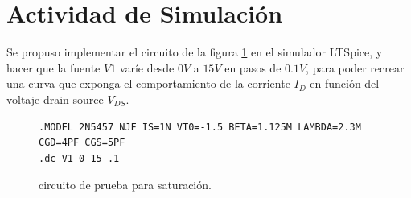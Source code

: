   \section{Actividad de Simulación}
    Se propuso implementar el circuito de la figura \ref{crkt:jfet-sat} en el simulador LTSpice, y hacer que la fuente
    $V1$ varíe desde $0V$ a $15V$ en pasos de $0.1V$, para poder recrear una curva que exponga el comportamiento de la
    corriente $I_D$ en función del voltaje drain-source $V_{DS}$.
    \begin{figure}[!ht]
      \centering
      \begin{minipage}{0.45\textwidth}
        \caption{circuito de prueba para saturación.}
        \label{crkt:jfet-sat}
      \end{minipage}
      \hfill
      \begin{minipage}{0.45\textwidth}
        \begin{lstlisting}[style=ltspice, caption={Parámetros de simulación LTspice}, label=list:jfet-sat]
.MODEL 2N5457 NJF IS=1N VT0=-1.5 BETA=1.125M LAMBDA=2.3M CGD=4PF CGS=5PF
.dc V1 0 15 .1
        \end{lstlisting}
      \end{minipage}
    \end{figure}

